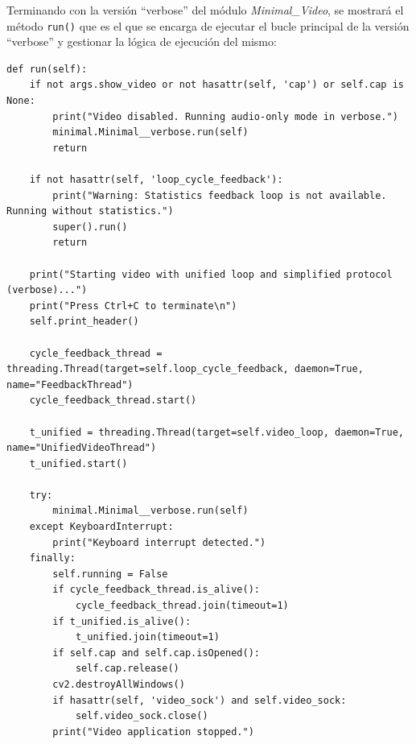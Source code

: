Terminando con la versión ``verbose'' del módulo \textit{Minimal\_Video}, se mostrará el método \texttt{run()} que es el que se encarga de ejecutar el bucle principal de la versión ``verbose'' y gestionar la lógica de ejecución del mismo:
\begin{lstlisting}[style=pythonstyle, caption={Método \texttt{run()} de \textit{Minimal\_Video\_verbose}.}, label={lst:run_minimal_video_verbose}]
def run(self):
    if not args.show_video or not hasattr(self, 'cap') or self.cap is None:
        print("Video disabled. Running audio-only mode in verbose.")
        minimal.Minimal__verbose.run(self)
        return

    if not hasattr(self, 'loop_cycle_feedback'):
        print("Warning: Statistics feedback loop is not available. Running without statistics.")
        super().run()
        return

    print("Starting video with unified loop and simplified protocol (verbose)...")
    print("Press Ctrl+C to terminate\n")
    self.print_header()

    cycle_feedback_thread = threading.Thread(target=self.loop_cycle_feedback, daemon=True, name="FeedbackThread")
    cycle_feedback_thread.start()

    t_unified = threading.Thread(target=self.video_loop, daemon=True, name="UnifiedVideoThread")
    t_unified.start()

    try:
        minimal.Minimal__verbose.run(self)
    except KeyboardInterrupt:
        print("Keyboard interrupt detected.")
    finally:
        self.running = False
        if cycle_feedback_thread.is_alive():
            cycle_feedback_thread.join(timeout=1)
        if t_unified.is_alive():
            t_unified.join(timeout=1)
        if self.cap and self.cap.isOpened():
            self.cap.release()
        cv2.destroyAllWindows()
        if hasattr(self, 'video_sock') and self.video_sock:
            self.video_sock.close()
        print("Video application stopped.")
\end{lstlisting}
\vspace{\baselineskip}

